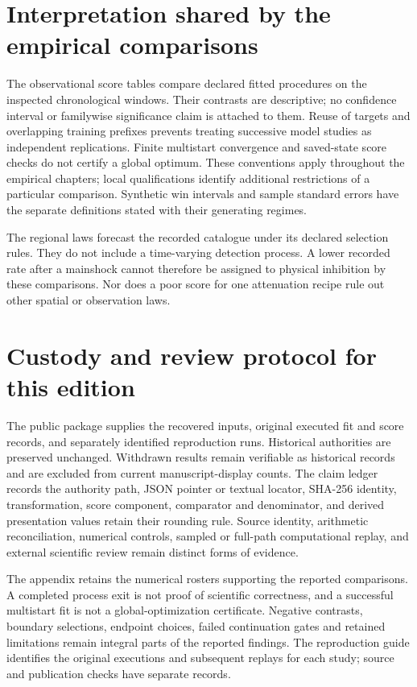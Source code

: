 \section{Interpretation shared by the empirical comparisons}\label{sec:empirical-interpretation}

The observational score tables compare declared fitted procedures on the inspected chronological windows. Their contrasts are descriptive; no confidence interval or familywise significance claim is attached to them. Reuse of targets and overlapping training prefixes prevents treating successive model studies as independent replications. Finite multistart convergence and saved-state score checks do not certify a global optimum. These conventions apply throughout the empirical chapters; local qualifications identify additional restrictions of a particular comparison. Synthetic win intervals and sample standard errors have the separate definitions stated with their generating regimes.

The regional laws forecast the recorded catalogue under its declared selection rules. They do not include a time-varying detection process. A lower recorded rate after a mainshock cannot therefore be assigned to physical inhibition by these comparisons. Nor does a poor score for one attenuation recipe rule out other spatial or observation laws.

\section{Custody and review protocol for this edition}

The public package supplies the recovered inputs, original executed fit and score records, and separately identified reproduction runs. Historical authorities are preserved unchanged. Withdrawn results remain verifiable as historical records and are excluded from current manuscript-display counts. The claim ledger records the authority path, JSON pointer or textual locator, SHA-256 identity, transformation, score component, comparator and denominator, and derived presentation values retain their rounding rule. Source identity, arithmetic reconciliation, numerical controls, sampled or full-path computational replay, and external scientific review remain distinct forms of evidence.

The appendix retains the numerical rosters supporting the reported comparisons. A completed process exit is not proof of scientific correctness, and a successful multistart fit is not a global-optimization certificate. Negative contrasts, boundary selections, endpoint choices, failed continuation gates and retained limitations remain integral parts of the reported findings. The reproduction guide identifies the original executions and subsequent replays for each study; source and publication checks have separate records.
